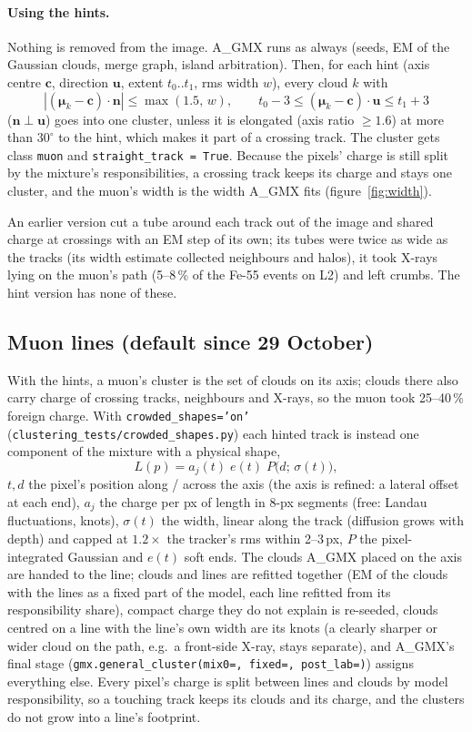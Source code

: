 \documentclass[11pt,a4paper]{article}
\newcommand{\AGMX}{A\_GMX}
\newcommand{\code}[1]{\texttt{#1}}
\begin{document}
\paragraph{Using the hints.} Nothing is removed from the image. \AGMX{} runs as always (seeds, EM of the Gaussian clouds, merge
graph, island arbitration). Then, for each hint (axis centre $\mathbf c$, direction $\mathbf u$, extent $t_0..t_1$,
rms width $w$), every cloud $k$ with
\[ |(\boldsymbol\mu_k-\mathbf c)\cdot\mathbf n|\le\max(1.5,\,w),\qquad t_0-3\le(\boldsymbol\mu_k-\mathbf c)\cdot\mathbf u\le t_1+3 \]
($\mathbf n\perp\mathbf u$) goes into one cluster, unless it is elongated (axis ratio $\ge1.6$) at more than $30^\circ$ to the
hint, which makes it part of a crossing track. The cluster gets class \code{muon} and \code{straight\_track = True}. Because the
pixels' charge is still split by the mixture's responsibilities, a crossing track keeps its charge and stays one cluster, and the
muon's width is the width \AGMX{} fits (figure~\ref{fig:width}).

An earlier version cut a tube around each track out of the image and shared charge at crossings with an EM step of its own; its
tubes were twice as wide as the tracks (its width estimate collected neighbours and halos), it took X-rays lying on the muon's
path (5--8\,\% of the Fe-55 events on L2) and left crumbs. The hint version has none of these.

\subsection{Muon lines (default since 29 October)}\label{sec:lines}
With the hints, a muon's cluster is the set of clouds on its axis; clouds there also carry charge of crossing tracks,
neighbours and X-rays, so the muon took 25--40\,\% foreign charge. With \code{crowded\_shapes='on'}
(\code{clustering\_tests/crowded\_shapes.py}) each hinted track is instead one component of the mixture with a physical shape,
\[ L(p) = a_j(t)\;e(t)\;P\big(d;\,\sigma(t)\big), \]
$t, d$ the pixel's position along / across the axis (the axis is refined: a lateral offset at each end), $a_j$ the charge per
px of length in 8-px segments (free: Landau fluctuations, knots), $\sigma(t)$ the width, linear along the track (diffusion grows
with depth) and capped at $1.2\times$ the tracker's rms within 2--3\,px, $P$ the pixel-integrated Gaussian and $e(t)$ soft ends.
The clouds \AGMX{} placed on the axis are handed to the line; clouds and lines are refitted together (EM of the clouds with
the lines as a fixed part of the model, each line refitted from its responsibility share), compact charge they do not explain
is re-seeded, clouds centred on a line with the line's own width are its knots (a clearly sharper or wider cloud on the path,
e.g.\ a front-side X-ray, stays separate), and \AGMX's final stage (\code{gmx.general\_cluster(mix0=, fixed=, post\_lab=)})
assigns everything else. Every pixel's charge is split between lines and clouds by model responsibility, so a touching track keeps
its clouds and its charge, and the clusters do not grow into a line's footprint.
\end{document}
